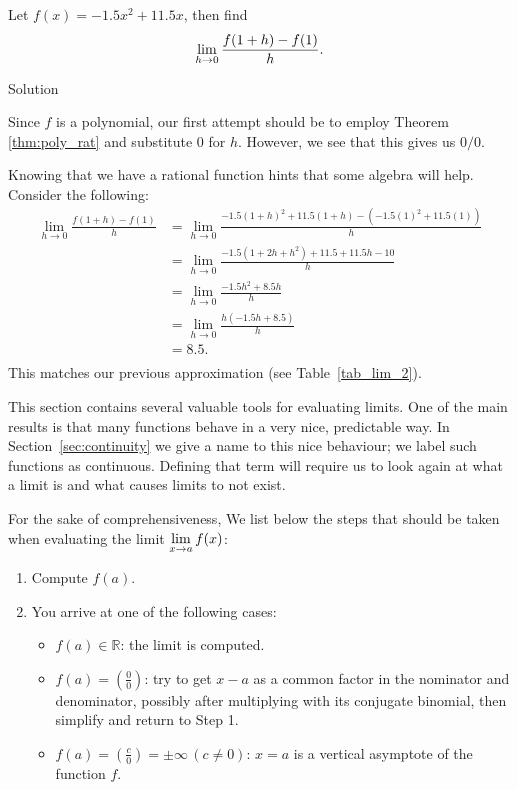 \ifanalysis\pagebreak\fi
\begin{example}\label{ex_limit_diffquot}
Let $f(x) = -1.5x^2+11.5x$, then find 
$$\displaystyle \lim_{h\to 0}\frac{f(1+h)-f(1)}{h}.$$

Solution 

Since $f$ is a polynomial, our first attempt should be to employ Theorem \ref{thm:poly_rat} and substitute 0 for $h$. However, we see that this gives us $0/0$.

 Knowing that we have a rational function hints that some algebra will help. Consider the following:
		\begin{align*}
		\lim_{h\to 0}\frac{f(1+h)-f(1)}{h} 	&= 	\lim_{h\to 0}\frac{-1.5(1+h)^2 + 11.5(1+h) - \left(-1.5(1)^2+11.5(1)\right)}{h} \\
																				&=	\lim_{h\to 0}\frac{-1.5(1+2h+h^2) + 11.5+11.5h - 10}{h}\\
																				&=	\lim_{h\to 0}\frac{-1.5h^2 +8.5h}{h}\\
																				&= 	\lim_{h\to 0}\frac{h(-1.5h+8.5)}h\\
																				&= 	8.5. \quad \\
		\end{align*}					
This matches our previous approximation (see Table~\ref{tab_lim_2}).
\end{example}

\fi

This section contains several valuable tools for evaluating limits. One of the main results is that many functions behave in a very nice, predictable way. In Section~\ref{sec:continuity} we give a name to this nice behaviour; we label such functions as continuous. Defining that term will require us to look again at what a limit is and what causes limits to not exist.


For the sake of comprehensiveness, We list below the steps that should be taken when evaluating the limit $\displaystyle\lim_{x\to a} f(x)$:

\begin{enumerate}
\item Compute $f(a)$.  
\item You arrive at one of the following cases:
\begin{itemize}
\item $ f(a) \in\mathbb{R}$: the limit is computed.  
\item $f(a) = \left(\frac{0}{0}\right)$:  try to get $x-a$ as a common factor in the nominator and denominator, possibly after multiplying with its conjugate binomial, then simplify and return to Step 1.
\item $f(a) = \left(\frac{c}{0}\right) = \pm\infty \, (c \neq 0):\, x=a$ is a vertical asymptote  of the function $f$. 
\end{itemize}
\end{enumerate}


